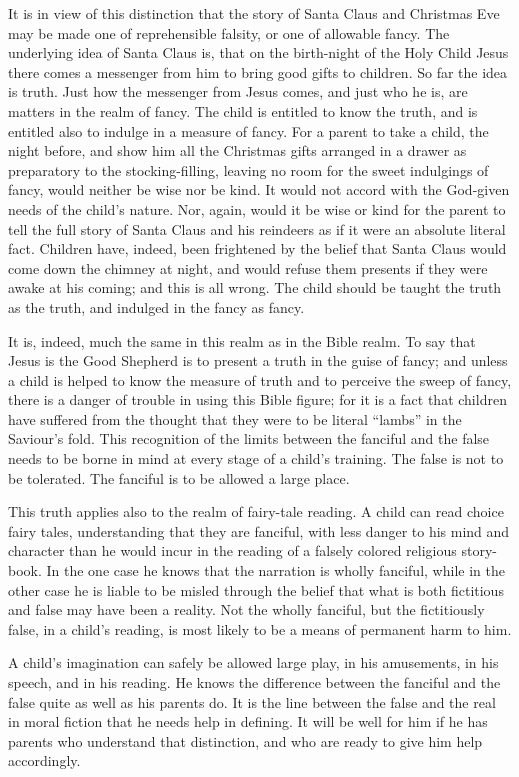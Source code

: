 \documentclass[
]{book}
\begin{document}
It is in view of this distinction that the story of Santa Claus and Christmas Eve may be made one of reprehensible falsity, or one of allowable fancy. The underlying idea of Santa Claus is, that on the birth-night of the Holy Child Jesus there comes a messenger from him to bring good gifts to children. So far the idea is truth. Just how the messenger from Jesus comes, and just who he is, are matters in the realm of fancy. The child is entitled to know the truth, and is entitled also to indulge in a measure of fancy. For a parent to take a child, the night before, and show him all the Christmas gifts arranged in a drawer as preparatory to the stocking-filling, leaving no room for the sweet indulgings of fancy, would neither be wise nor be kind. It would not accord with the God-given needs of the child's nature. Nor, again, would it be wise or kind for the parent to tell the full story of Santa Claus and his reindeers as if it were an absolute literal fact. Children have, indeed, been frightened by the belief that Santa Claus would come down the chimney at night, and would refuse them presents if they were awake at his coming; and this is all wrong. The child should be taught the truth as the truth, and indulged in the fancy as fancy.

It is, indeed, much the same in this realm as in the Bible realm. To say that Jesus is the Good Shepherd is to present a truth in the guise of fancy; and unless a child is helped to know the measure of truth and to perceive the sweep of fancy, there is a danger of trouble in using this Bible figure; for it is a fact that children have suffered from the thought that they were to be literal ``lambs'' in the Saviour's fold. This recognition of the limits between the fanciful and the false needs to be borne in mind at every stage of a child's training. The false is not to be tolerated. The fanciful is to be allowed a large place.

This truth applies also to the realm of fairy-tale reading. A child can read choice fairy tales, understanding that they are fanciful, with less danger to his mind and character than he would incur in the reading of a falsely colored religious story-book. In the one case he knows that the narration is wholly fanciful, while in the other case he is liable to be misled through the belief that what is both fictitious and false may have been a reality. Not the wholly fanciful, but the fictitiously false, in a child's reading, is most likely to be a means of permanent harm to him.

A child's imagination can safely be allowed large play, in his amusements, in his speech, and in his reading. He knows the difference between the fanciful and the false quite as well as his parents do. It is the line between the false and the real in moral fiction that he needs help in defining. It will be well for him if he has parents who understand that distinction, and who are ready to give him help accordingly.
\end{document}
